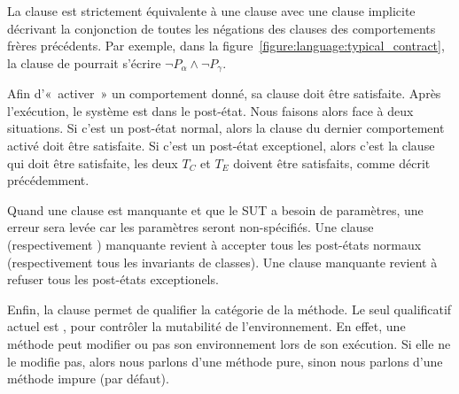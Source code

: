 La clause \adefault est strictement équivalente à une clause \abehavior avec une
clause \arequires implicite décrivant la conjonction de toutes les négations des
clauses \arequires des comportements frères précédents.  Par exemple, dans la
figure~\ref{figure:language:typical_contract}, la clause \arequires de \adefault
pourrait s'écrire $\neg P_\alpha \land \neg P_\gamma$.

Afin d'«~activer~» un comportement donné, sa clause \arequires doit être
satisfaite. Après l'exécution, le système est dans le post-état. Nous faisons
alors face à deux situations. Si c'est un post-état normal, alors la clause
\aensures du dernier comportement activé doit être satisfaite. Si c'est un
post-état exceptionel, alors c'est la clause \athrowable qui doit être
satisfaite, \ie les deux $T_C$ et $T_E$ doivent être satisfaits, comme décrit
précédemment.

Quand une clause \arequires est manquante et que le SUT a besoin de paramètres,
une erreur sera levée car les paramètres seront non-spécifiés. Une clause
\aensures (respectivement \ainvariant) manquante revient à accepter tous les
post-états normaux (respectivement tous les invariants de classes). Une clause
\athrowable manquante revient à refuser tous les post-états exceptionels.

Enfin, la clause \ais permet de qualifier la catégorie de la méthode. Le seul
qualificatif actuel est , pour contrôler la mutabilité de
l'environnement. En effet, une méthode peut modifier ou pas son environnement
lors de son exécution. Si elle ne le modifie pas, alors nous parlons d'une
méthode {\strong pure}, sinon nous parlons d'une méthode {\strong impure} (par
défaut). \\

